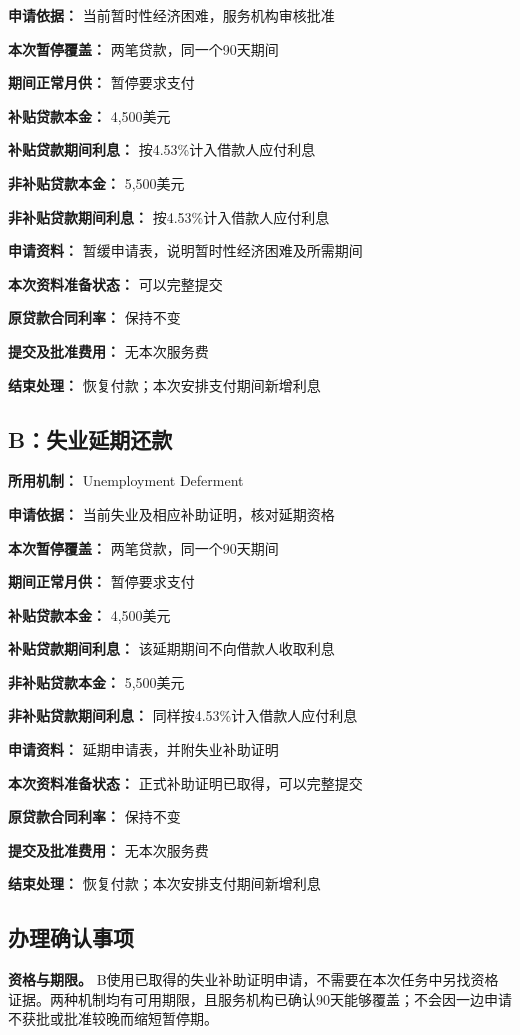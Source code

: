 \documentclass[UTF8,fontset=none,11pt,a4paper]{ctexart}
\begin{document}
\textbf{申请依据：} 当前暂时性经济困难，服务机构审核批准


\textbf{本次暂停覆盖：} 两笔贷款，同一个90天期间


\textbf{期间正常月供：} 暂停要求支付


\textbf{补贴贷款本金：} 4,500美元


\textbf{补贴贷款期间利息：} 按4.53\%计入借款人应付利息


\textbf{非补贴贷款本金：} 5,500美元


\textbf{非补贴贷款期间利息：} 按4.53\%计入借款人应付利息


\textbf{申请资料：} 暂缓申请表，说明暂时性经济困难及所需期间


\textbf{本次资料准备状态：} 可以完整提交


\textbf{原贷款合同利率：} 保持不变


\textbf{提交及批准费用：} 无本次服务费


\textbf{结束处理：} 恢复付款；本次安排支付期间新增利息


\subsection*{B：失业延期还款}
\textbf{所用机制：} Unemployment Deferment


\textbf{申请依据：} 当前失业及相应补助证明，核对延期资格


\textbf{本次暂停覆盖：} 两笔贷款，同一个90天期间


\textbf{期间正常月供：} 暂停要求支付


\textbf{补贴贷款本金：} 4,500美元


\textbf{补贴贷款期间利息：} 该延期期间不向借款人收取利息


\textbf{非补贴贷款本金：} 5,500美元


\textbf{非补贴贷款期间利息：} 同样按4.53\%计入借款人应付利息


\textbf{申请资料：} 延期申请表，并附失业补助证明


\textbf{本次资料准备状态：} 正式补助证明已取得，可以完整提交


\textbf{原贷款合同利率：} 保持不变


\textbf{提交及批准费用：} 无本次服务费


\textbf{结束处理：} 恢复付款；本次安排支付期间新增利息


\subsection*{办理确认事项}
\textbf{资格与期限。} B使用已取得的失业补助证明申请，不需要在本次任务中另找资格证据。两种机制均有可用期限，且服务机构已确认90天能够覆盖；不会因一边申请不获批或批准较晚而缩短暂停期。
\end{document}
